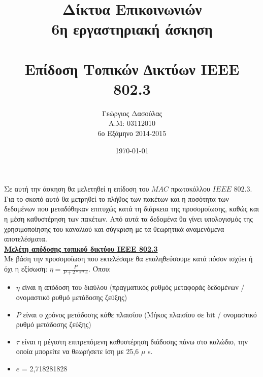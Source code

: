 \documentclass{article}%
\begin{document}

\title{Δίκτυα Επικοινωνιών\\6η εργαστηριακή άσκηση\\  \indent \\
\textbf{Επίδοση Τοπικών ∆ικτύων \textlatin{IEEE 802.3}} }
\author{Γεώργιος Δασούλας\\Α.Μ: 03112010 \\ 6ο Εξάμηνο 2014-2015  }
\date{\today}
\maketitle

Σε αυτή την άσκηση θα μελετηθεί η επίδοση του $MAC$ πρωτοκόλλου $IEEE$ $802.3$. Για το σκοπό αυτό θα
μετρηθεί το πλήθος των πακέτων και η ποσότητα των δεδομένων που μεταδόθηκαν επιτυχώς κατά τη
διάρκεια της προσομοίωσης, καθώς και η μέση καθυστέρηση των πακέτων. Από αυτά τα δεδομένα θα
γίνει υπολογισμός της χρησιμοποίησης του καναλιού και σύγκριση με τα θεωρητικά αναμενόμενα
αποτελέσματα.\\


\textbf{\large{\underline{Μελέτη απόδοσης τοπικού δικτύου ΙΕΕΕ 802.3}}}\\ 
Με βάση την προσομοίωση που εκτελέσαμε θα επαληθεύσουμε κατά πόσον ισχύει ή όχι η εξίσωση:
$\displaystyle{\eta= \frac{P}{P+2*\tau*e}}$.
Όπου:
\begin{itemize}
\item $\eta$ είναι η απόδοση του διαύλου (πραγματικός ρυθμός μεταφοράς δεδομένων / ονομαστικό
ρυθμό μετάδοσης ζεύξης) 
\item $P$ είναι ο χρόνος μετάδοσης κάθε πλαισίου (Μήκος πλαισίου σε bit / ονομαστικό ρυθμό
μετάδοσης ζεύξης)
\item $\tau$ είναι η μέγιστη επιτρεπόμενη καθυστέρηση διάδοσης πάνω στο καλώδιο, την οποία
μπορείτε να θεωρήσετε ίση με \textlatin{25,6 $\mu$ s}.
\item $e$ = 2,718281828
\end{itemize}
\end{document}
